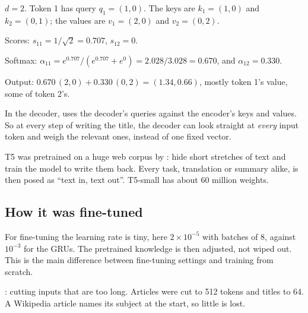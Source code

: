 \begin{example}
$d = 2$. Token 1 has query $q_1 = (1, 0)$. The keys are $k_1 = (1, 0)$ and $k_2 = (0, 1)$; the values are $v_1 = (2, 0)$ and $v_2 = (0, 2)$.
\begin{steps}
  \item Scores: $s_{11} = 1/\sqrt2 = 0.707$, $s_{12} = 0$.
  \item Softmax: $\alpha_{11} = e^{0.707}/(e^{0.707} + e^0) = 2.028/3.028 = 0.670$, and $\alpha_{12} = 0.330$.
  \item Output: $0.670\,(2, 0) + 0.330\,(0, 2) = (1.34, 0.66)$, mostly token 1's value, some of token 2's.
\end{steps}
\end{example}

\begin{definition}
In the decoder,  uses the decoder's queries against the encoder's keys and values. So at every step of writing the title, the decoder can look straight at \emph{every} input token and weigh the relevant ones, instead of one fixed vector.
\end{definition}

\begin{definition}
T5 was pretrained on a huge web corpus by : hide short stretches of text and train the model to write them back. Every task, translation or summary alike, is then posed as ``text in, text out''. T5-small has about 60 million weights.
\end{definition}

\subsection*{How it was fine-tuned}

\begin{definition}
For fine-tuning the learning rate is tiny, here $2 \times 10^{-5}$ with batches of 8, against $10^{-3}$ for the GRUs. The pretrained knowledge is then adjusted, not wiped out. This is the main difference between fine-tuning settings and training from scratch.
\end{definition}

\begin{definition}[Truncation]
: cutting inputs that are too long. Articles were cut to 512 tokens and titles to 64. A Wikipedia article names its subject at the start, so little is lost.
\end{definition}

